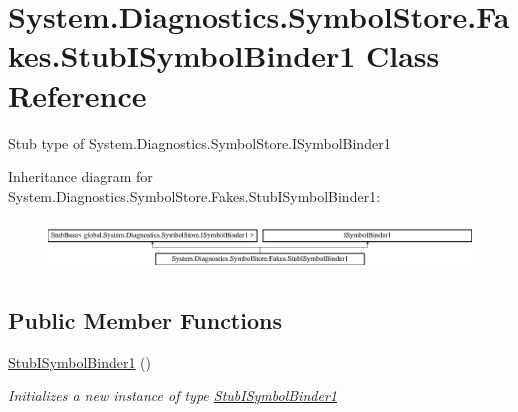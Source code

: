\hypertarget{class_system_1_1_diagnostics_1_1_symbol_store_1_1_fakes_1_1_stub_i_symbol_binder1}{\section{System.\-Diagnostics.\-Symbol\-Store.\-Fakes.\-Stub\-I\-Symbol\-Binder1 Class Reference}
\label{class_system_1_1_diagnostics_1_1_symbol_store_1_1_fakes_1_1_stub_i_symbol_binder1}
}


Stub type of System.\-Diagnostics.\-Symbol\-Store.\-I\-Symbol\-Binder1 


Inheritance diagram for System.\-Diagnostics.\-Symbol\-Store.\-Fakes.\-Stub\-I\-Symbol\-Binder1\-:\begin{figure}[H]
\begin{center}
\leavevmode
\includegraphics[height=1.362530cm]{class_system_1_1_diagnostics_1_1_symbol_store_1_1_fakes_1_1_stub_i_symbol_binder1}
\end{center}
\end{figure}
\subsection*{Public Member Functions}
\begin{DoxyCompactItemize}
\item 
\hyperlink{class_system_1_1_diagnostics_1_1_symbol_store_1_1_fakes_1_1_stub_i_symbol_binder1_acaf497e72a053af84717ec2629e1276c}{Stub\-I\-Symbol\-Binder1} ()
\begin{DoxyCompactList}\small\item\em Initializes a new instance of type \hyperlink{class_system_1_1_diagnostics_1_1_symbol_store_1_1_fakes_1_1_stub_i_symbol_binder1}{Stub\-I\-Symbol\-Binder1}\end{DoxyCompactList}\end{DoxyCompactItemize}
